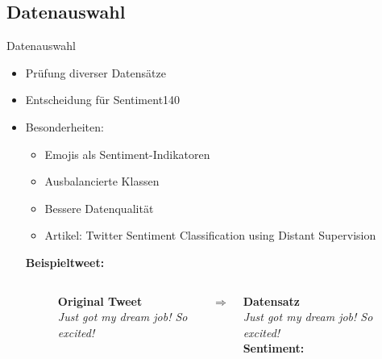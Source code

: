 \documentclass[aspectratio=169]{beamer} %
\begin{document}
\subsection{Datenauswahl}
\begin{frame}{Datenauswahl}
  \begin{itemize}
      \item Prüfung diverser Datensätze
      \item Entscheidung für \glqq Sentiment140\grqq
      \item Besonderheiten:
      \begin{itemize}
          \item Emojis als Sentiment-Indikatoren
          \item Ausbalancierte Klassen
          \item Bessere Datenqualität
          \item Artikel: \glqq Twitter Sentiment Classification using Distant Supervision\grqq
      \end{itemize}

      \vspace{0.5cm}
  \textbf{Beispieltweet:}
  \vspace{0.2cm}

\begin{figure}
    \centering
    \begin{columns}[T]
        \begin{column}{0.45\textwidth}
            \centering
            \textbf{Original Tweet}\\
            \textit{Just got my dream job! So excited! \yellowhighlight{:)}}
            \vspace{0.5cm}
        \end{column}

        \begin{column}{0.1\textwidth}
            \centering
            \LARGE $\Rightarrow$
        \end{column}

        \begin{column}{0.45\textwidth}
            \centering
            \textbf{Datensatz}\\
            \textit{Just got my dream job! So excited!} \\
            \vspace{0.2cm}
            \textbf{Sentiment: }
            \vspace{0.5cm}
        \end{column}
    \end{columns}
\end{figure}

  \end{itemize}
\end{frame}
\end{document}
